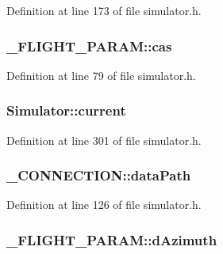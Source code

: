 Definition at line 173 of file simulator.\-h.

\hypertarget{group___h_i_t_l_plugin_ga2fbe36224e421144a3822791ccd78c7b}{
\subsubsection[{cas}]{ \-\_\-\-F\-L\-I\-G\-H\-T\-\_\-\-P\-A\-R\-A\-M\-::cas}}\label{group___h_i_t_l_plugin_ga2fbe36224e421144a3822791ccd78c7b}


Definition at line 79 of file simulator.\-h.

\hypertarget{group___h_i_t_l_plugin_gaa4ad7484ddab07936a31a63fab4be22e}{
\subsubsection[{current}]{ Simulator\-::current\hspace{0.3cm}{\ttfamily [protected]}}}\label{group___h_i_t_l_plugin_gaa4ad7484ddab07936a31a63fab4be22e}


Definition at line 301 of file simulator.\-h.

\hypertarget{group___h_i_t_l_plugin_ga4505c573ba399fc3e915fec6842c3bcb}{
\subsubsection[{data\-Path}]{ \-\_\-\-C\-O\-N\-N\-E\-C\-T\-I\-O\-N\-::data\-Path}}\label{group___h_i_t_l_plugin_ga4505c573ba399fc3e915fec6842c3bcb}


Definition at line 126 of file simulator.\-h.

\hypertarget{group___h_i_t_l_plugin_gaeb046a092ad0f1b208a0341f7e6fd520}{
\subsubsection[{d\-Azimuth}]{ \-\_\-\-F\-L\-I\-G\-H\-T\-\_\-\-P\-A\-R\-A\-M\-::d\-Azimuth}}\label{group___h_i_t_l_plugin_gaeb046a092ad0f1b208a0341f7e6fd520}


